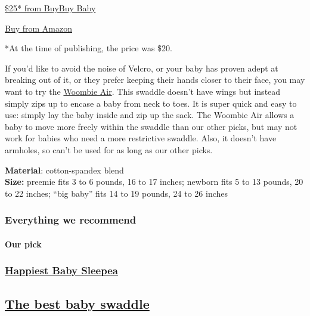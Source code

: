 \href{https://shop-links.co/1715878907105142814}{\$25* from BuyBuy Baby}

\href{https://www.nytimes3xbfgragh.onion/wirecutter/out/link/30688/150979/4/86634?merchant=Amazon}{Buy
from Amazon}

*At the time of publishing, the price was \$20.

If you'd like to avoid the noise of Velcro, or your baby has proven
adept at breaking out of it, or they prefer keeping their hands closer
to their face, you may want to try the
\href{https://www.nytimes3xbfgragh.onion/wirecutter/out/link/30688/154051/4/86637/?merchant=BuyBuy\%20Baby}{Woombie
Air}. This swaddle doesn't have wings but instead simply zips up to
encase a baby from neck to toes. It is super quick and easy to use:
simply lay the baby inside and zip up the sack. The Woombie Air allows a
baby to move more freely within the swaddle than our other picks, but
may not work for babies who need a more restrictive swaddle. Also, it
doesn't have armholes, so can't be used for as long as our other picks.

\textbf{Material}: cotton-spandex blend\\
\textbf{Size:} preemie fits 3 to 6 pounds, 16 to 17 inches; newborn fits
5 to 13 pounds, 20 to 22 inches; ``big baby'' fits 14 to 19 pounds, 24
to 26 inches

\hypertarget{everything-we-recommend}{%
\subsubsection{Everything we recommend}\label{everything-we-recommend}}

\hypertarget{our-pick-1}{%
\paragraph{Our pick}\label{our-pick-1}}

\href{https://www.nytimes3xbfgragh.onion/wirecutter/out/link/30686/150977/4/86632?merchant=Amazon}{}

\hypertarget{happiest-baby-sleepea-1}{%
\subsubsection{\texorpdfstring{\href{https://www.nytimes3xbfgragh.onion/wirecutter/out/link/30686/150977/4/86632?merchant=Amazon}{Happiest
Baby Sleepea}}{Happiest Baby Sleepea}}\label{happiest-baby-sleepea-1}}

\hypertarget{the-best-baby-swaddle-1}{%
\subsection{\texorpdfstring{\href{https://www.nytimes3xbfgragh.onion/wirecutter/out/link/30686/150977/4/86632?merchant=Amazon}{The
best baby
swaddle}}{The best baby swaddle}}\label{the-best-baby-swaddle-1}}

